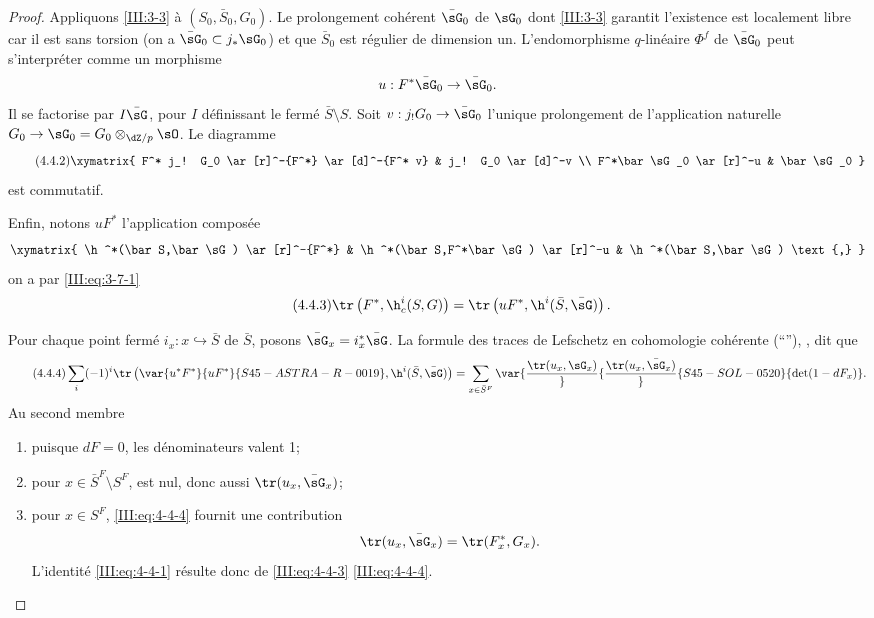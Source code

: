 \begin{proof}
Appliquons \ref{III:3-3} à $(S_0,\bar S_0,G_0)$. Le prolongement cohérent 
$\bar\sG_0$ de $\sG_0$ dont \ref{III:3-3} garantit l'existence est localement 
libre car il est sans torsion (on a $\bar\sG_0\subset j_*\sG_0$) et que 
$\bar S_0$  est régulier de dimension un. L'endomorphisme $q$-linéaire 
$\Phi^f$ de $\bar\sG_0$ peut s'interpréter comme un morphisme 
\[
  u : F^*\bar\sG_0 \to \bar\sG_0 \text{.}
\]
Il se factorise par $I\bar\sG$, pour $I$ définissant le fermé 
$\bar S\setminus S$. Soit $v:j_!G_0 \to \bar\sG_0$ l'unique prolongement de 
l'application naturelle $G_0 \to \sG_0 = G_0\otimes_{\dZ/p}\sO$. Le diagramme 
\begin{equation*}\tag{4.4.2}\label{III:eq:4-4-2}
\xymatrix{
  F^* j_! G_0 \ar[r]^-{F^*} \ar[d]^-{F^* v} 
    & j_! G_0 \ar[d]^-v \\
  F^*\bar \sG_0 \ar[r]^-u 
    & \bar\sG_0
}
\end{equation*}
est commutatif.

Enfin, notons $u F^*$ l'application composée 
\[\xymatrix{
  \h^*(\bar S,\bar\sG) \ar[r]^-{F^*} 
    & \h^*(\bar S,F^*\bar\sG) \ar[r]^-u 
    & \h^*(\bar S,\bar\sG) \text{,}
}\]
on a par \eqref{III:eq:3-7-1}
\begin{equation*}\tag{4.4.3}\label{III:eq:4-4-3}
  \tr\left(F^*,\h_c^i(S,G)\right) = \tr\left(u F^*,\h^i(\bar S,\bar\sG)\right) \text{.}
\end{equation*}

Pour chaque point fermé $i_x:x\hookrightarrow \bar  S$ de $\bar S$, posons 
$\bar\sG_x = i_x^*\bar\sG$. La formule des traces de Lefschetz en cohomologie 
cohérente (``''), , dit 
que 
\begin{equation*}\tag{4.4.4}\label{III:eq:4-4-4}
  \sum_i (-1)^i \tr\left(\var{u^* F^*}{u F^*}{S45-ASTRA-R-0019}, \h^i(\bar S,\bar\sG)\right) = \sum_{x\in \bar S^F} \var{\frac{\tr(u_x,\sG_x)}}{\frac{\tr(u_x,\bar\sG_x)}}{S45-SOL-0520}{\det(1-d F_x)} \text{.}
\end{equation*}
Au second membre
\begin{enumerate}[\indent a)]
  \item puisque $d F=0$, les dénominateurs valent 1;
  \item pour $x\in \bar S^F\setminus S^F$,  
    est nul, donc aussi $\tr(u_x,\bar\sG_x)$;
  \item pour $x\in S^F$, \eqref{III:eq:4-4-4} fournit une contribution 
    \[
      \tr(u_x,\bar\sG_x) = \tr(F_x^*,G_x) \text{.}
    \]
    L'identité \eqref{III:eq:4-4-1} résulte donc de \eqref{III:eq:4-4-3} 
    \eqref{III:eq:4-4-4}. 
\end{enumerate}
\end{proof}





